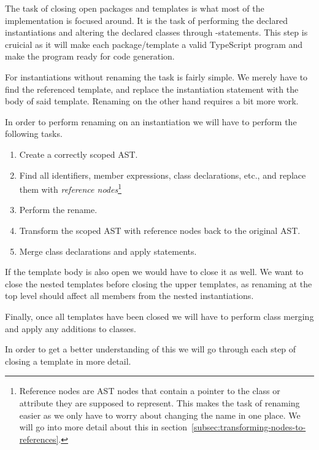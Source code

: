 The task of closing open packages and templates is what most of the implementation is focused around.
It is the task of performing the declared instantiations and altering the declared classes through -statements.
This step is cruicial as it will make each package/template a valid TypeScript program and make the program ready for code generation.

For instantiations without renaming the task is fairly simple.
We merely have to find the referenced template, and replace the instantiation statement with the body of said template.
Renaming on the other hand requires a bit more work.

In order to perform renaming on an instantiation we will have to perform the following tasks.
\begin{enumerate}
    \item Create a correctly scoped AST\@.
    \item Find all identifiers, member expressions, class declarations, etc., and replace them with \textit{reference nodes}\footnote{Reference nodes are AST nodes that contain a pointer to the class or attribute they are supposed to represent. This makes the task of renaming easier as we only have to worry about changing the name in one place. We will go into more detail about this in section~\vref{subsec:transforming-nodes-to-references}.}
    \item Perform the rename.
    \item Transform the scoped AST with reference nodes back to the original AST\@.
    \item Merge class declarations and apply  statements.
\end{enumerate}

If the template body is also open we would have to close it as well.
We want to close the nested templates before closing the upper templates, as renaming at the top level should affect all members from the nested instantiations.

Finally, once all templates have been closed we will have to perform class merging and apply any additions to classes.

In order to get a better understanding of this we will go through each step of closing a template in more detail.


